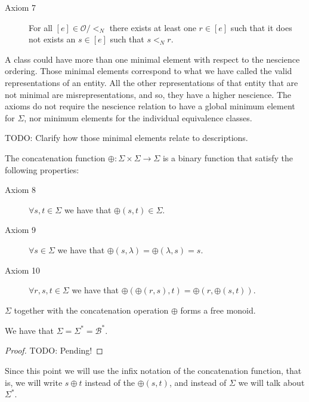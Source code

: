 \begin{description}
\item[Axiom 7] For all $[e] \in \mathcal{O} / <_N$ there exists at least one $r \in [e]$ such that it does not exists an $s \in [e]$ such that $s <_N r$.
\end{description}

\vskip 0.25cm

A class could have more than one minimal element with respect to the nescience ordering. Those minimal elements correspond to what we have called the valid representations of an entity. All the other representations of that entity that are not minimal are misrepresentations, and so, they have a higher nescience. The axioms do not require the nescience relation to have a global minimum element for $\Sigma$, nor minimum elements for the individual equivalence classes.

{\color{red} TODO: Clarify how those minimal elements relate to descriptions.}

The concatenation function $\oplus : \Sigma \times \Sigma \rightarrow \Sigma$ is a binary function that satisfy the following properties:

\vskip 0.25cm

\begin{description}
\item[Axiom 8] $\forall s, t \in \Sigma$ we have that $\oplus(s, t) \in \Sigma$.
\item[Axiom 9] $\forall s \in \Sigma$ we have that $\oplus(s, \lambda) = \oplus( \lambda, s) = s$.
\item[Axiom 10] $\forall r, s, t \in \Sigma$ we have that $\oplus(\oplus(r, s), t) = \oplus(r, \oplus(s, t))$.
\end{description}

\vskip 0.25cm

$\Sigma$ together with the concatenation operation $\oplus$ forms a free monoid.

\begin{proposition}
We have that $\Sigma = \Sigma^\ast = \mathcal{B}^\ast$. 
\end{proposition}
\begin{proof}
{\color{red} TODO: Pending!}
\end{proof}

Since this point we will use the infix notation of the concatenation function, that is, we will write $s \oplus t$ instead of the $\oplus(s, t)$, and instead of $\Sigma$ we will talk about $\Sigma^\ast$.

